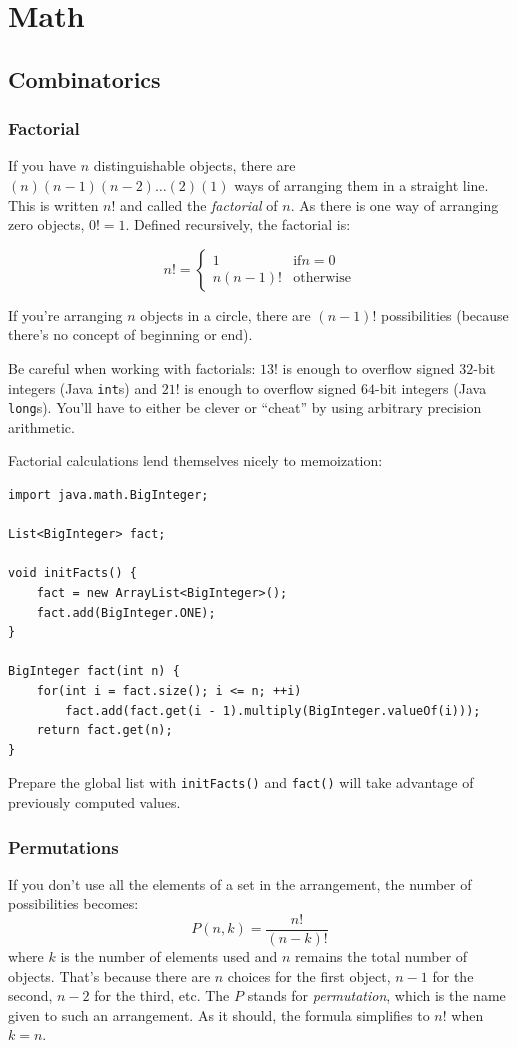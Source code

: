 \documentclass[a4paper,12pt]{article}
\begin{document}
\newpage\section{Math}

\subsection{Combinatorics}

\subsubsection{Factorial}

If you have $n$ distinguishable objects, there are $(n)(n-1)(n-2)\ldots(2)(1)$ ways of arranging them in a straight line. This is written $n!$ and called the {\em factorial} of $n$. As there is one way of arranging zero objects, $0! = 1$. Defined recursively, the factorial is:

\[n! = \begin{cases}1 & \mathrm{if }n=0 \\ n(n-1)! & \mathrm{otherwise}\end{cases}\]

If you're arranging $n$ objects in a circle, there are $(n-1)!$ possibilities (because there's no concept of beginning or end).

Be careful when working with factorials: $13!$ is enough to overflow signed $32$-bit integers (Java \verb/int/s) and $21!$ is enough to overflow signed $64$-bit integers (Java \verb/long/s). You'll have to either be clever or ``cheat'' by using arbitrary precision arithmetic.

Factorial calculations lend themselves nicely to memoization:

\begin{lstlisting}
import java.math.BigInteger;

List<BigInteger> fact;
	
void initFacts() {
	fact = new ArrayList<BigInteger>();
	fact.add(BigInteger.ONE);
}

BigInteger fact(int n) {
	for(int i = fact.size(); i <= n; ++i)
		fact.add(fact.get(i - 1).multiply(BigInteger.valueOf(i)));
	return fact.get(n);
}
\end{lstlisting}

Prepare the global list with \verb/initFacts()/ and \verb/fact()/ will take advantage of previously computed values.

\subsubsection{Permutations}
If you don't use all the elements of a set in the arrangement, the number of possibilities becomes:
\[P(n,k) = \frac{n!}{(n-k)!}\]
\noindent where $k$ is the number of elements used and $n$ remains the total number of objects. That's because there are $n$ choices for the first object, $n-1$ for the second, $n-2$ for the third, etc. The $P$ stands for {\em permutation}, which is the name given to such an arrangement. As it should, the formula simplifies to $n!$ when $k=n$.
\end{document}
